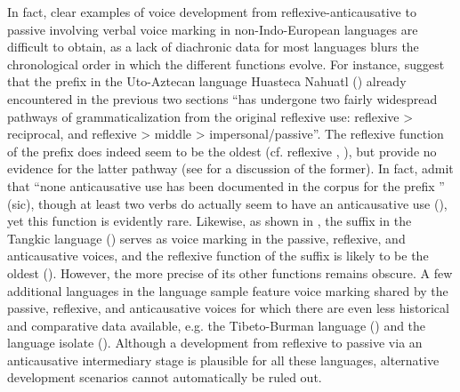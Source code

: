In fact, clear examples of voice development from reflexive-anticausative to passive involving verbal voice marking in non-Indo-European languages are difficult to obtain, as a lack of diachronic data for most languages blurs the chronological order in which the different functions evolve. For instance, \citet[102]{llanes:al:2017} suggest that the prefix  in the Uto-Aztecan language Huasteca Nahuatl () already encountered in the previous two sections “has undergone two fairly widespread pathways of grammaticalization from the original reflexive use: reflexive > reciprocal, and reflexive > middle > impersonal/passive”. The reflexive function of the prefix does indeed seem to be the oldest (cf.  reflexive , \citealt{langacker:1976}), but \citet{llanes:al:2017} provide no evidence for the latter pathway (see  for a discussion of the former). In fact, \citet[102]{llanes:al:2017} admit that “none anticausative use has been documented in the corpus for the prefix ” (sic), though at least two verbs do actually seem to have an anticausative use (), yet this function is evidently rare. Likewise, as shown in , the suffix  in the Tangkic language  () serves as voice marking in the passive, reflexive, and anticausative voices, and the reflexive function of the suffix is likely to be the oldest (). However, the more precise  of its other functions remains obscure. A few additional languages in the language sample feature voice marking shared by the passive, reflexive, and anticausative voices for which there are even less historical and comparative data available, e.g. the Tibeto-Burman language  () and the language isolate  (). Although a development from reflexive to passive via an anticausative intermediary stage is plausible for all these languages, alternative development scenarios cannot automatically be ruled out.


